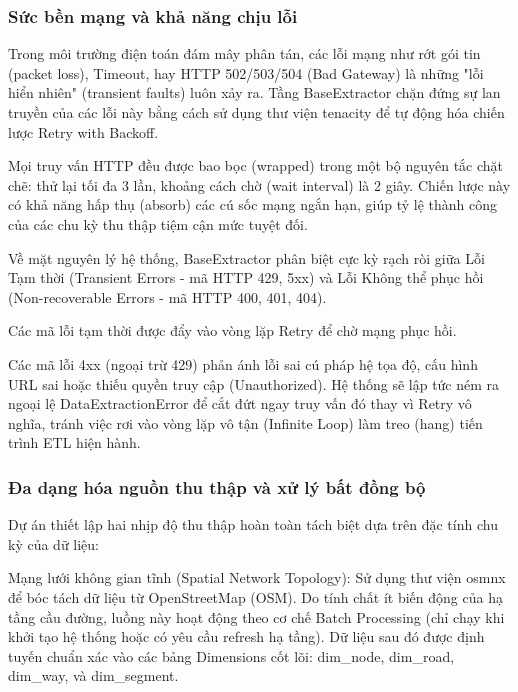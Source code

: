 \subsubsection{Sức bền mạng và khả năng chịu lỗi}
Trong môi trường điện toán đám mây phân tán, các lỗi mạng như rớt gói tin (packet loss), Timeout, hay HTTP 502/503/504 (Bad Gateway) là những "lỗi hiển nhiên" (transient faults) luôn xảy ra. Tầng BaseExtractor chặn đứng sự lan truyền của các lỗi này bằng cách sử dụng thư viện tenacity để tự động hóa chiến lược Retry with Backoff.


Mọi truy vấn HTTP đều được bao bọc (wrapped) trong một bộ nguyên tắc chặt chẽ: thử lại tối đa 3 lần, khoảng cách chờ (wait interval) là 2 giây. Chiến lược này có khả năng hấp thụ (absorb) các cú sốc mạng ngắn hạn, giúp tỷ lệ thành công của các chu kỳ thu thập tiệm cận mức tuyệt đối.


Về mặt nguyên lý hệ thống, BaseExtractor phân biệt cực kỳ rạch ròi giữa Lỗi Tạm thời (Transient Errors - mã HTTP 429, 5xx) và Lỗi Không thể phục hồi (Non-recoverable Errors - mã HTTP 400, 401, 404).


Các mã lỗi tạm thời được đẩy vào vòng lặp Retry để chờ mạng phục hồi.


Các mã lỗi 4xx (ngoại trừ 429) phản ánh lỗi sai cú pháp hệ tọa độ, cấu hình URL sai hoặc thiếu quyền truy cập (Unauthorized). Hệ thống sẽ lập tức ném ra ngoại lệ DataExtractionError để cắt đứt ngay truy vấn đó thay vì Retry vô nghĩa, tránh việc rơi vào vòng lặp vô tận (Infinite Loop) làm treo (hang) tiến trình ETL hiện hành.


\subsubsection{Đa dạng hóa nguồn thu thập và xử lý bất đồng bộ}
Dự án thiết lập hai nhịp độ thu thập hoàn toàn tách biệt dựa trên đặc tính chu kỳ của dữ liệu:


Mạng lưới không gian tĩnh (Spatial Network Topology): Sử dụng thư viện osmnx để bóc tách dữ liệu từ OpenStreetMap (OSM). Do tính chất ít biến động của hạ tầng cầu đường, luồng này hoạt động theo cơ chế Batch Processing (chỉ chạy khi khởi tạo hệ thống hoặc có yêu cầu refresh hạ tầng). Dữ liệu sau đó được định tuyến chuẩn xác vào các bảng Dimensions cốt lõi: dim\_node, dim\_road, dim\_way, và dim\_segment.


